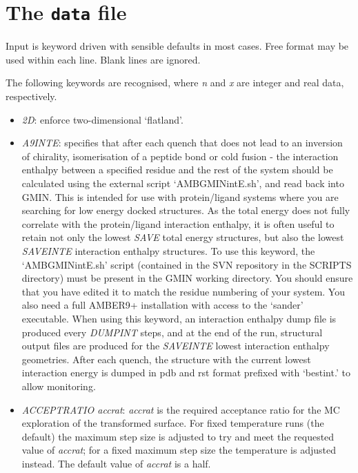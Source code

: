 \documentclass[12pt,a4paper,dvips]{article}
\begin{document}
\section{The {\tt data} file}

Input is keyword driven with sensible defaults in most cases. 
Free format may be used within each line. Blank lines are ignored.

The following keywords are recognised, where {\it n\/} and {\it x\/} are integer and
real data, respectively.
\smallskip
\begin{itemize}
\item {\it 2D\/}: enforce two-dimensional `flatland'.

\item {\it A9INTE\/}: specifies that after each quench that does not lead to an inversion of chirality, 
isomerisation of a peptide bond or cold fusion - the interaction enthalpy between a specified residue and the rest of the system
should be calculated using the external script `AMBGMINintE.sh', and read back into GMIN. This is intended for
use with protein/ligand systems where you are searching for low energy docked structures. As the total energy
does not fully correlate with the protein/ligand interaction enthalpy, it is often useful to retain not only the
lowest {\it SAVE\/} total energy structures, but also the lowest {\it SAVEINTE\/} interaction enthalpy structures.
To use this keyword, the `AMBGMINintE.sh' script (contained in the SVN repository in the SCRIPTS directory) must
be present in the GMIN working directory. You should ensure that you have edited it to match the residue numbering
of your system. You also need a full AMBER9+ installation with access to the `sander' executable. When using this
keyword, an interaction enthalpy dump file is produced every {\it DUMPINT\/} steps, and at the end of the run, 
structural output files are produced for the {\it SAVEINTE\/} lowest interaction enthalpy geometries. After each quench, 
the structure with the current lowest interaction energy is dumped in pdb and rst format prefixed with `bestint.' to allow
monitoring.

\item {\it ACCEPTRATIO accrat\/}: {\it accrat\/} is the required acceptance ratio for the MC
exploration of the transformed surface. For fixed temperature runs (the default) the maximum step size
is adjusted to try and meet the requested value of {\it accrat\/}; for a fixed maximum
step size the temperature is adjusted instead. The default value of {\it accrat\/} is a half.


\end{itemize}
\end{document}
